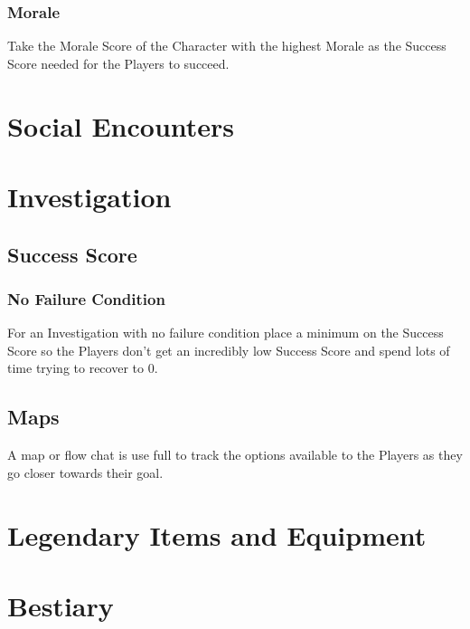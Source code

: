 \documentclass[a4paper,12pt,oneside]{book}
\begin{document}
                \subsubsection{Morale}
                    Take the Morale Score of the Character with the highest Morale as the Success Score needed for the Players to succeed.
        \section{Social Encounters}

        \section{Investigation}
            \subsection{Success Score}
                \subsubsection{No Failure Condition}
                    For an Investigation with no failure condition place a minimum on the Success Score so the Players don't get an incredibly low Success Score and spend lots of time trying to recover to 0.

            \subsection{Maps}
                A map or flow chat is use full to track the options available to the Players as they go closer towards their goal.

        \section{Legendary Items and Equipment}
        \section{Bestiary}


    \appendix

    \backmatter
    {}
    
    \printindex
\end{document}

